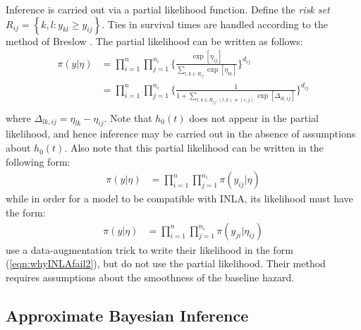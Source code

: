 \documentclass[]{article}
\begin{document}
Inference is carried out via a partial likelihood function. Define the \textit{risk set} $R_{ij} = \left\{k,l : y_{kl} \geq y_{ij}\right\}$. Ties in survival times are handled according to the method of Breslow \citep{Breslow}. The partial likelihood can be written as follows: 
\begin{equation}\begin{aligned}\label{eqn:partial}
\pi(y|\eta) &= \prod_{i=1}^{n}\prod_{j=1}^{n_{i}} \bigg\{\frac{\exp[\eta_{ij}]}{{\sum_{l,k\in R_{ij}}^{}\exp[\eta_{lk}]}}\bigg \}^{d_{ij}} \\
&= \prod_{i=1}^{n}\prod_{j=1}^{n_{i}} \bigg\{\frac{1}{{1 + \sum_{l,k\in R_{ij} , (l,k) \neq (i,j)}\exp[\Delta_{lk,ij}]}}\bigg \}^{d_{ij}} \\
\end{aligned}\end{equation}
where $\Delta_{lk,ij} = \eta_{lk} - \eta_{ij}$. Note that $h_{0}(t)$ does not appear in the partial likelihood, and hence inference may be carried out in the absence of assumptions about $h_{0}(t)$. Also note that this partial likelihood can be written in the following form:
\begin{equation}\begin{aligned}\label{eqn:whyINLAfail1}
\pi(y|\eta) &= \prod_{i=1}^{n}\prod_{j=1}^{n_{i}} \pi(y_{ij}|\eta)
\end{aligned}\end{equation}
while in order for a model to be compatible with INLA, its likelihood must have the form:
\begin{equation}\begin{aligned}\label{eqn:whyINLAfail2}
\pi(y|\eta) &= \prod_{i=1}^{n}\prod_{j=1}^{n_{i}} \pi(y_{ji}|\eta_{ij})
\end{aligned}\end{equation}
\citet{inlacoxph} use a data-augmentation trick to write their likelihood in the form (\ref{eqn:whyINLAfail2}), but do not use the partial likelihood. Their method requires assumptions about the smoothness of the baseline hazard.

\subsection{Approximate Bayesian Inference}
\end{document}
